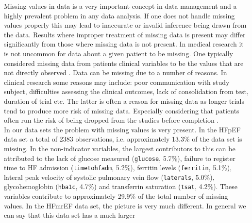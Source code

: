 \documentclass[../thesis.tex]{subfiles}
\begin{document}
\noindent Missing values in data is a very important concept in data management and a highly prevalent problem in any data analysis. If one does not handle missing values properly this may lead to inaccurate or invalid inference being drawn from the data. Results where improper treatment of missing data is present may differ significantly from those where missing data is not present. In medical research it is not uncommon for data about a given patient to be missing. One typically considered missing data from patients clinical variables to be the values that are not directly observed \citep{ibrahim2012missing}. Data can be missing due to a number of reasons. In clinical research some reasons may include: poor communication with study subject, difficulties assessing the clinical outcomes, 
lack of consolidation from test, duration of trial etc. The latter is often a reason for missing data as longer trials tend to produce more risk of missing data. Especially considering that patients often run the risk of being dropped from the studies before completion \citep{myers2000handling}.\\
\indent In our data sets the problem with missing values is very present. In the HFpEF data set a total of 2383 observations, i.e. approximately 13.3\% of the data set is missing. In the non-indicator variables, the largest contributors to this can be attributed to the lack of glucose measured (\texttt{glucose}, 5.7\%), failure to register time to HF admission (\texttt{timetohfadm}, 5.2\%), ferritin levels (\texttt{ferritin}, 5.1\%), lateral peak velocity of systolic pulmonary vein flow (\texttt{laterals}, 5.0\%), glycohemoglobin (\texttt{hba1c}, 4.7\%) and transferrin saturation (\texttt{tsat}, 4.2\%). These variables contribute to approximately 29.9\% of the total number of missing values. In the HFmrEF data set, the picture is very much different. In general we can say that this data set has a much larger 


\end{document}
